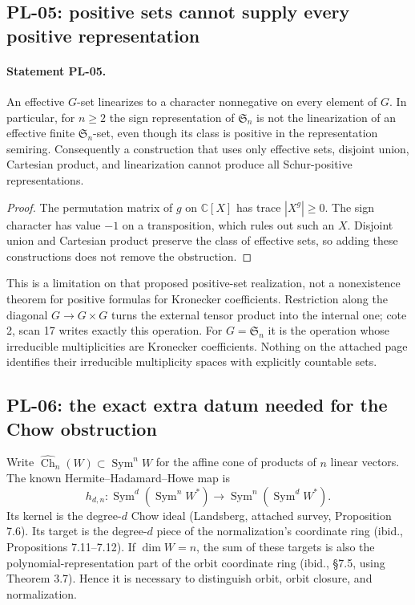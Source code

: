 \documentclass[11pt,a4paper]{article}
\begin{document}
\subsection{PL-05: positive sets cannot supply every positive representation}
\paragraph{Statement PL-05.}
An effective $G$-set linearizes to a character nonnegative on every element
of $G$. In particular, for $n\geq2$ the sign representation of $\mathfrak S_n$
is not the linearization of an effective finite $\mathfrak S_n$-set, even
though its class is positive in the representation semiring. Consequently a
construction that uses only effective sets, disjoint union, Cartesian product,
and linearization cannot produce all Schur-positive representations.

\begin{proof}
The permutation matrix of $g$ on $\mathbb C[X]$ has trace $|X^g|\geq0$.
The sign character has value $-1$ on a transposition, which rules out such
an $X$. Disjoint union and Cartesian product preserve the class of effective
sets, so adding these constructions does not remove the obstruction.
\end{proof}

This is a limitation on that proposed positive-set realization, not a
nonexistence theorem for positive formulas for Kronecker coefficients.
Restriction along the diagonal $G\to G\times G$ turns the external tensor
product into the internal one; cote 2, scan 17 writes exactly this operation.
For $G=\mathfrak S_n$ it is the operation whose irreducible multiplicities
are Kronecker coefficients. Nothing on the attached page identifies their
irreducible multiplicity spaces with explicitly countable sets.

\subsection{PL-06: the exact extra datum needed for the Chow obstruction}
Write $\widehat{\operatorname{Ch}}_n(W)\subset\operatorname{Sym}^nW$ for
the affine cone of products of $n$ linear vectors. The known
Hermite--Hadamard--Howe map is
\[
 h_{d,n}:\operatorname{Sym}^d(\operatorname{Sym}^nW^*)
       \longrightarrow\operatorname{Sym}^n(\operatorname{Sym}^dW^*).
\]
Its kernel is the degree-$d$ Chow ideal (Landsberg, attached survey,
Proposition 7.6). Its target is the degree-$d$ piece of the normalization's
coordinate ring (ibid., Propositions 7.11--7.12). If $\dim W=n$, the sum
of these targets is also the polynomial-representation part of the orbit
coordinate ring (ibid., \S7.5, using Theorem 3.7). Hence it is necessary
to distinguish orbit, orbit closure, and normalization.
\end{document}
